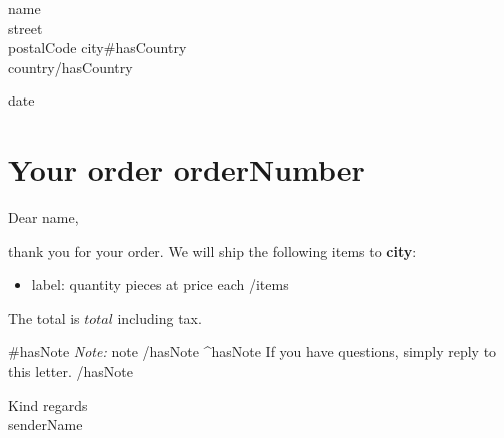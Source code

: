 \documentclass[11pt]{article}
\newcommand{\field}[1]{\textbf{#1}}
\begin{document}
{{name}}\\
{{street}}\\
{{postalCode}} {{city}}{{#hasCountry}}\\{{country}}{{/hasCountry}}

\bigskip
{{date}}

\section*{Your order {{orderNumber}}}

Dear {{name}},

thank you for your order. We will ship the following items to \field{{{city}}}:
\begin{itemize}
{{#items}}  \item {{label}}: {{quantity}} pieces at {{price}} each
{{/items}}\end{itemize}
The total is $ {{total}} $ including tax.

{{#hasNote}}
\emph{Note:} {{note}}
{{/hasNote}}
{{^hasNote}}
If you have questions, simply reply to this letter.
{{/hasNote}}

Kind regards\\
{{senderName}}
\end{document}
